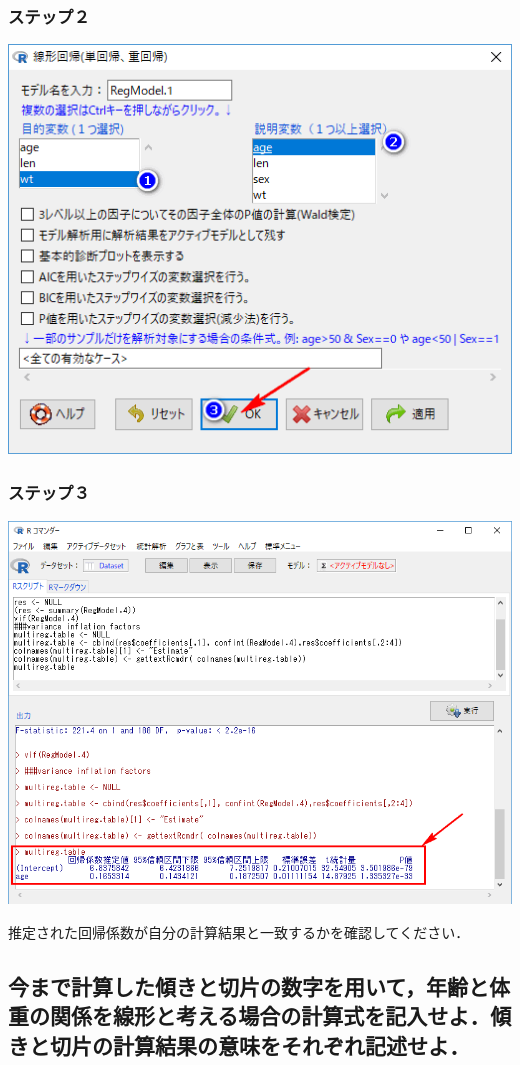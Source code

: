 \documentclass[]{problemset}
\begin{document}
\hypertarget{-6}{%
\subsubsection{ステップ２}\label{-6}}

\begin{center}\includegraphics[width=0.6\linewidth]{pic/lm01} \end{center}

\hypertarget{-7}{%
\subsubsection{ステップ３}\label{-7}}

\begin{center}\includegraphics[width=0.8\linewidth]{pic/lm02} \end{center}

推定された回帰係数が自分の計算結果と一致するかを確認してください．

\subsection{今まで計算した傾きと切片の数字を用いて，年齢と体重の関係を線形と考える場合の計算式を記入せよ．傾きと切片の計算結果の意味をそれぞれ記述せよ．}
\end{document}
